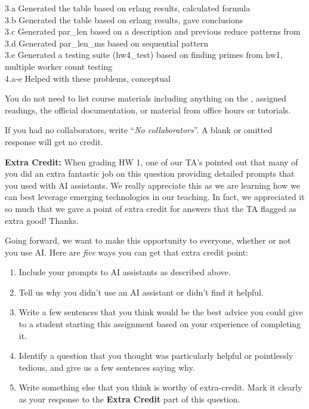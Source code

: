 \documentclass{article}
\newenvironment{answer}
{\color{blue}}
{\normalfont}
\begin{document}
\begin{enumerate}
\begin{answer}
              3.a Generated the table based on erlang results, calculated formula \\
              3.b Generated the table based on erlang results, gave conclusions \\
              3.c Generated par\_len based on a description and previous reduce patterns from  \\
              3.d Generated par\_len\_ms based on sequential pattern \\
              3.e Generated a testing suite (hw4\_test) based on finding primes from hw1, multiple worker count testing \\
              4.a-e Helped with these problems, conceptual \\


          \end{answer}
          \par
          You do not need to list course materials including anything on the
          ,
          assigned readings, the official  documentation,
          or material from office hours or tutorials.
          \par
          If you had no collaborators, write ``\textit{No collaborators}''.
          A blank or omitted response will get no credit.
          \par
          \textbf{Extra Credit:} When grading HW 1, one of our TA's pointed out that many of
          you did an extra fantastic job on this question providing detailed prompts that
          you used with AI assistants.  We really appreciate this as we are learning how
          we can best leverage emerging technologies in our teaching.  In fact, we appreciated
          it so much that we gave a point of extra credit for answers that the TA flagged
          as extra good!  Thanks.

          Going forward, we want to make this opportunity to everyone, whether or not you use AI.
          Here are \emph{five} ways you can get that extra credit point:
          \begin{enumerate}
              \item Include your prompts to AI assistants as described above.
              \item Tell us why you didn't use an AI assistant or didn't find it helpful.
              \item Write a few sentences that you think would be the best advice you could
                    give to a student starting this assignment based on your experience of
                    completing it.
              \item Identify a question that you thought was particularly helpful or
                    pointlessly tedious, and give us a few sentences saying why.
              \item Write something else that you think is worthy of extra-credit.
                    Mark it clearly as your response to the \textbf{Extra Credit} part
                    of this question.




\end{enumerate}
\end{enumerate}
\end{document}
